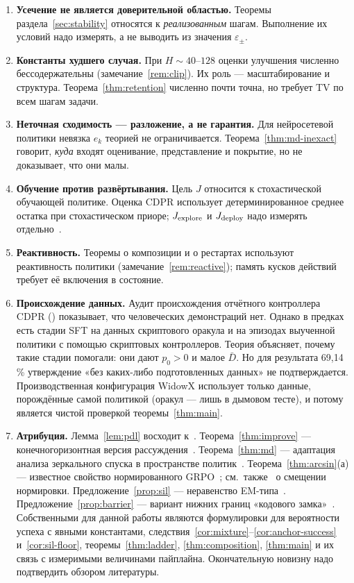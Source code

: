 \documentclass[11pt,a4paper]{article}
\theoremstyle{plain}
\theoremstyle{definition}
\theoremstyle{remark}
\begin{document}
\begin{enumerate}
\item \textbf{Усечение не является доверительной областью.} Теоремы раздела~\ref{sec:stability} относятся к \emph{реализованным} шагам. Выполнение их условий надо измерять, а не выводить из значения $\varepsilon_\pm$.
\item \textbf{Константы худшего случая.} При $H\sim40$--$128$ оценки улучшения численно бессодержательны (замечание~\ref{rem:clip}). Их роль --- масштабирование и структура. Теорема~\ref{thm:retention} численно почти точна, но требует TV по всем шагам задачи.
\item \textbf{Неточная сходимость --- разложение, а не гарантия.} Для нейросетевой политики невязка $e_k$ теорией не ограничивается. Теорема~\ref{thm:md-inexact} говорит, \emph{куда} входят оценивание, представление и покрытие, но не доказывает, что они малы.
\item \textbf{Обучение против развёртывания.} Цель $J$ относится к стохастической обучающей политике. Оценка CDPR использует детерминированное среднее остатка при стохастическом приоре; $J_{\rm explore}$ и $J_{\rm deploy}$ надо измерять отдельно~\cite{notes}.
\item \textbf{Реактивность.} Теоремы о композиции и о рестартах используют реактивность политики (замечание~\ref{rem:reactive}); память кусков действий требует её включения в состояние.
\item \textbf{Происхождение данных.} Аудит происхождения отчётного контроллера CDPR () показывает, что человеческих демонстраций нет. Однако в предках есть стадии SFT на данных скриптового оракула и на эпизодах выученной политики с помощью скриптовых контроллеров. Теория объясняет, почему такие стадии помогали: они дают $p_0>0$ и малое $\bar D$. Но для результата 69{,}14\,\% утверждение «без каких-либо подготовленных данных» не подтверждается. Производственная конфигурация WidowX использует только данные, порождённые самой политикой (оракул --- лишь в дымовом тесте), и потому является чистой проверкой теоремы~\ref{thm:main}.
\item \textbf{Атрибуция.} Лемма~\ref{lem:pdl} восходит к~\cite{kakade-langford}. Теорема~\ref{thm:improve} --- конечногоризонтная версия рассуждения~\cite{trpo,cpo}. Теорема~\ref{thm:md} --- адаптация анализа зеркального спуска в пространстве политик~\cite{shani,lan,xiao,agarwal}. Теорема~\ref{thm:arcsin}(а) --- известное свойство нормированного GRPO~\cite{mroueh}; см.\ также~\cite{dr-grpo} о смещении нормировки. Предложение~\ref{prop:sil} --- неравенство EM-типа~\cite{dayan-hinton,rwr}. Предложение~\ref{prop:barrier} --- вариант нижних границ «кодового замка»~\cite{kakade-thesis}. Собственными для данной работы являются формулировки для вероятности успеха с явными константами, следствия~\ref{cor:mixture}--\ref{cor:anchor-success} и~\ref{cor:sil-floor}, теоремы~\ref{thm:ladder}, \ref{thm:composition}, \ref{thm:main} и их связь с измеримыми величинами пайплайна. Окончательную новизну надо подтвердить обзором литературы.
\end{enumerate}
\end{document}
